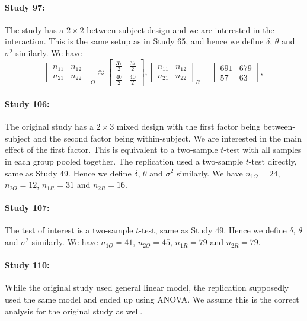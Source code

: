 \documentclass[11pt]{article}
\theoremstyle{definition}
\theoremstyle{custom}
\begin{document}
  \paragraph{Study 97: \citet{PurdieVaughns:2008en}}
  The study has a $2 \times 2$ between-subject design and we are interested in the interaction. This is the same setup as in Study 65, and hence we define $\delta$, $\theta$ and $\sigma^2$ similarly. We have
  \[
  \begin{bmatrix}
  n_{11} & n_{12} \\
  n_{21} & n_{22}
  \end{bmatrix}_O \approx \begin{bmatrix}
  \frac{37}{2} & \frac{37}{2} \\
  \frac{40}{2} & \frac{40}{2}
  \end{bmatrix}, \begin{bmatrix}
  n_{11} & n_{12} \\
  n_{21} & n_{22}
  \end{bmatrix}_R = \begin{bmatrix}
  691 & 679 \\
  57 & 63
  \end{bmatrix},
  \]

  \paragraph{Study 106: \citet{Dessalegn:2008gh}}
  The original study has a $2 \times 3$ mixed design with the first factor being between-subject and the second factor being within-subject. We are interested in the main effect of the first factor. This is equivalent to a two-sample $t$-test with all samples in each group pooled together. The replication used a two-sample $t$-test directly, same as Study 49. Hence we define $\delta$, $\theta$ and $\sigma^2$ similarly. We have $n_{1O} = 24$, $n_{2O} = 12$, $n_{1R} = 31$ and $n_{2R} = 16$.

  \paragraph{Study 107: \citet{Eitam:2008cm}}
  The test of interest is a two-sample $t$-test, same as Study 49. Hence we define $\delta$, $\theta$ and $\sigma^2$ similarly. We have $n_{1O} = 41$, $n_{2O} = 45$, $n_{1R} = 79$ and $n_{2R} = 79$.

  \paragraph{Study 110: \citet{Farris:2008ev}}
  While the original study used general linear model, the replication supposedly used the same model and ended up using ANOVA. We assume this is the correct analysis for the original study as well.
\end{document}
